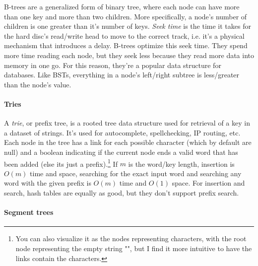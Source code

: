 \documentclass[table, xcdraw]{article}%
\begin{document}
B-trees are a generalized form of binary tree, where each node can have more than one key and more than two children. More specifically, a node's number of children is one greater than it's number of keys. \emph{Seek time} is the time it takes for the hard disc's read/write head to move to the correct track, i.e. it's a physical mechanism that introduces a delay. B-trees optimize this seek time. They spend more time reading each node, but they seek less because they read more data into memory in one go. For this reason, they're a popular data structure for databases. Like BSTs, everything in a node's left/right subtree is less/greater than the node's value.

\paragraph{Tries}

A \emph{trie}, or prefix tree, is a rooted tree data structure used for retrieval of a key in a dataset of strings. It's used for autocomplete, spellchecking, IP routing, etc. Each node in the tree has a link for each possible character (which by default are null) and a boolean indicating if the current node ends a valid word that has been added (else its just a prefix).\footnote{You can also visualize it as the nodes representing characters, with the root node representing the empty string "", but I find it more intuitive to have the links contain the characters.} If $m$ is the word/key length, insertion is $O(m)$ time and space, searching for the exact input word and searching any word with the given prefix is $O(m)$ time and $O(1)$ space. For insertion and search, hash tables are equally as good, but they don't support prefix search.

\paragraph{Segment trees}
\end{document}

